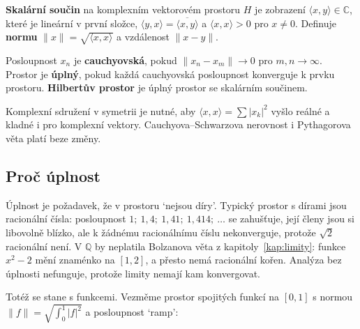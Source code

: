 \begin{definitionbox}
  \textbf{Skalární součin} na komplexním vektorovém prostoru $H$ je zobrazení $\langle x, y\rangle\in\mathbb{C}$, které je lineární v první složce, $\langle y, x\rangle = \overline{\langle x, y\rangle}$ a $\langle x, x\rangle > 0$ pro $x\neq 0$. Definuje \textbf{normu} $\|x\| = \sqrt{\langle x, x\rangle}$ a vzdálenost $\|x - y\|$.

  \vspace{0.2cm}

  Posloupnost $x_n$ je \textbf{cauchyovská}, pokud $\|x_n - x_m\|\to 0$ pro $m, n\to\infty$. Prostor je \textbf{úplný}, pokud každá cauchyovská posloupnost konverguje k prvku prostoru. \textbf{Hilbertův prostor} je úplný prostor se skalárním součinem.
\end{definitionbox}

Komplexní sdružení v symetrii je nutné, aby $\langle x, x\rangle = \sum|x_k|^2$ vyšlo reálné a kladné i pro komplexní vektory. Cauchyova--Schwarzova nerovnost i Pythagorova věta platí beze změny.

\subsection{Proč úplnost}

Úplnost je požadavek, že v prostoru `nejsou díry'. Typický prostor s dírami jsou racionální čísla: posloupnost $1;\ 1{,}4;\ 1{,}41;\ 1{,}414;\ \dots$ se zahušťuje, její členy jsou si libovolně blízko, ale k žádnému racionálnímu číslu nekonverguje, protože $\sqrt{2}$ racionální není. V $\mathbb{Q}$ by neplatila Bolzanova věta z kapitoly~\ref{kap:limity}: funkce $x^2 - 2$ mění znaménko na $[1, 2]$, a přesto nemá racionální kořen. Analýza bez úplnosti nefunguje, protože limity nemají kam konvergovat.

Totéž se stane s funkcemi. Vezměme prostor spojitých funkcí na $[0, 1]$ s normou $\|f\| = \sqrt{\int_0^1|f|^2}$ a posloupnost `ramp':

\begin{center}
\end{center}

